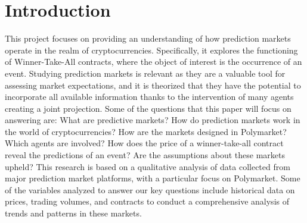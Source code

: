 \section{Introduction}
\label{sec:introduction}
This project focuses on providing an understanding of how prediction markets operate in the realm of cryptocurrencies. Specifically, it explores the functioning of Winner-Take-All contracts, where the object of interest is the occurrence of an event. Studying prediction markets is relevant as they are a valuable tool for assessing market expectations, and it is theorized that they have the potential to incorporate all available information thanks to the intervention of many agents creating a joint projection. Some of the questions that this paper will focus on answering are: What are predictive markets? How do prediction markets work in the world of cryptocurrencies? How are the markets designed in Polymarket? Which agents are involved? How does the price of a winner-take-all contract reveal the predictions of an event? Are the assumptions about these markets upheld?
This research is based on a qualitative analysis of data collected from major prediction market platforms, with a particular focus on Polymarket. Some of the variables analyzed to answer our key questions include historical data on prices, trading volumes, and contracts to conduct a comprehensive analysis of trends and patterns in these markets.
\lipsum[2]
